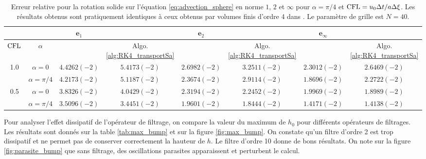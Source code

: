 \begin{table}[htbp]
\begin{center}
\begin{tabular}{|cc||cc||cc||cc|}
\hline 
 & & $\mathbf{e}_1$ &   & $\mathbf{e}_2$ &   & $\mathbf{e}_{\infty}$ &   \\ 
\hline 
$\text{CFL}$ & $\alpha$ & \cite{Ullrich2010} & Algo. \ref{alg:RK4_transportSa} & \cite{Ullrich2010} & Algo. \ref{alg:RK4_transportSa} & \cite{Ullrich2010} & Algo. \ref{alg:RK4_transportSa} \\ 
\hline 
1.0 & $\alpha = 0$ & $4.4262(-2)$ & $5.4173(-2)$ & $2.6982(-2)$ & $3.2511(-2)$ & $2.3012(-2)$ & $2.6469(-2)$ \\ 

  & $\alpha = \pi / 4$ & $4.2173(-2)$ & $5.1187(-2)$ & $2.3674(-2)$ & $2.9114(-2)$ & $1.8696(-2)$ & $2.2722(-2)$ \\ 
\hline 
0.5 & $\alpha = 0$ & $3.8326(-2)$ & $4.0429(-2)$ & $2.3194(-2)$ & $2.2452(-2)$ & $1.9969(-2)$ & $1.8989(-2)$ \\ 

  & $\alpha = \pi/4$ & $3.5096(-2)$ & $3.4451(-2)$ & $1.9601(-2)$ & $1.8444(-2)$ & $1.4171(-2)$ & $1.4138(-2)$ \\ 
\hline 
\end{tabular} 
\end{center}
\caption{Erreur relative pour la rotation solide sur l'équation \eqref{eq:advection_sphere} en norme $1$, $2$ et $\infty$ pour $\alpha = \pi / 4$ et $\text{CFL} = u_0 \Delta t / a \Delta \xi$. Les résultats obtenus sont pratiquement identiques à ceux obtenus par volumes finis d'ordre 4 dans \cite{Ullrich2010}. Le paramètre de grille est $N=40$.}
\label{tab:comp_ullrich_bump}
\end{table} 

Pour analyser l'effet dissipatif de l'opérateur de filtrage, on compare la valeur du maximum de $h_0$ pour différents opérateurs de filtrages. Les résultats sont donnés sur la table \ref{tab:max_bump} et sur la figure \ref{fig:max_bump}. On constate qu'un filtre d'ordre 2 est trop dissipatif et ne permet pas de conserver correctement la hauteur de $h$. Le filtre d'ordre 10 donne de bons résultats. On note sur la figure \ref{fig:parasite_bump} que sans filtrage, des oscillations parasites apparaissent et perturbent le calcul.

